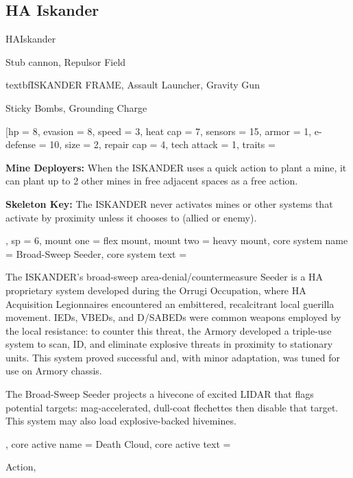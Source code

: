 \subsection{HA Iskander}

\begin{mech}{HA}{Iskander}


\begin{license}
\item Stub cannon, Repulsor Field
\item textbf{ISKANDER FRAME}, Assault Launcher, Gravity Gun
\item Sticky Bombs, Grounding Charge
\end{license}

\frameBox
[hp = 8,
evasion = 8,
speed = 3,
heat cap = 7,
sensors = 15,
armor = 1,
e-defense = 10,
size = 2,
repair cap = 4,
tech attack = 1,
traits = {\textbf{Mine Deployers:} When the ISKANDER uses a quick action to plant a mine, it can plant up to 2 other mines in free adjacent spaces as a free action.

\textbf{Skeleton Key:} The ISKANDER never activates mines or other systems that activate by proximity unless it chooses to (allied or enemy).},
sp = 6,
mount one = flex mount,
mount two = heavy mount,
core system name = Broad-Sweep Seeder,
core system text = {The ISKANDER’s broad-sweep area-denial/countermeasure Seeder is a HA proprietary system developed during the Orrugi Occupation, where HA Acquisition Legionnaires encountered an embittered, recalcitrant local guerilla movement. IEDs, VBEDs, and D/SABEDs were common weapons employed by the local resistance: to counter this threat, the Armory developed a triple-use system to scan, ID, and eliminate explosive threats in proximity to stationary units. This system proved successful and, with minor adaptation, was tuned for use on Armory chassis.

The Broad-Sweep Seeder projects a hivecone of excited LIDAR that flags potential targets: mag-accelerated, dull-coat flechettes then disable that target. This system may also load explosive-backed hivemines.},
core active name = Death Cloud,
core active text = {Action,

}
\end{mech}
